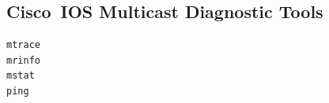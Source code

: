 \documentclass{../UTNetLab}
\begin{document}
\begin{appendices}
\begin{subappendices}
\subsection{Cisco~IOS Multicast Diagnostic Tools}
\begin{lstlisting}[language={cisco}]
mtrace
mrinfo
mstat
ping
\end{lstlisting}
    
    \end{subappendices}
\end{appendices}
\end{document}
